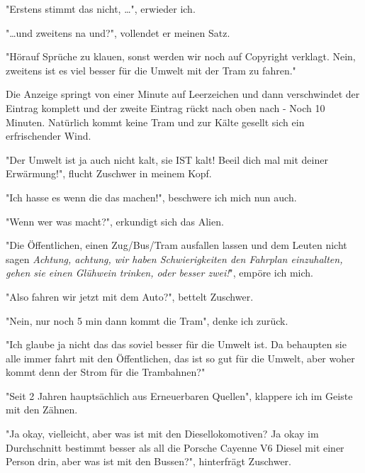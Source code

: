 \documentclass[11pt]{article}
\begin{document}
\begin{center}
"Erstens stimmt das nicht, \ldots{}", erwieder ich.
\end{center}
\begin{center}
"\ldots{}und zweitens na und?", vollendet er meinen Satz.
\end{center}
\begin{center}
"Hörauf Sprüche zu klauen, sonst werden wir noch auf Copyright
verklagt. Nein, zweitens ist es viel besser für die Umwelt mit der
Tram zu fahren."
\end{center}
Die Anzeige springt von einer Minute auf Leerzeichen und dann
verschwindet der Eintrag komplett und der zweite Eintrag rückt nach
oben nach - Noch 10 Minuten. Natürlich kommt keine Tram und zur
Kälte gesellt sich ein erfrischender Wind.
\begin{center}
"Der Umwelt ist ja auch nicht kalt, sie IST kalt! Beeil dich mal mit
deiner Erwärmung!", flucht Zuschwer in meinem Kopf.
\end{center}
\begin{center}
"Ich hasse es wenn die das machen!", beschwere ich mich nun auch.
\end{center}
\begin{center}
"Wenn wer was macht?", erkundigt sich das Alien.
\end{center}
\begin{center}
"Die Öffentlichen, einen Zug/Bus/Tram ausfallen lassen und dem Leuten
nicht sagen \emph{Achtung, achtung, wir haben Schwierigkeiten den Fahrplan
einzuhalten, gehen sie einen Glühwein trinken, oder besser zwei!}",
empöre ich mich.
\end{center}
\begin{center}
"Also fahren wir jetzt mit dem Auto?", bettelt Zuschwer.
\end{center}
\begin{center}
"Nein, nur noch 5 min dann kommt die Tram", denke ich zurück.
\end{center}
\begin{center}
"Ich glaube ja nicht das das soviel besser für die Umwelt ist. Da
behaupten sie alle immer fahrt mit den Öffentlichen, das ist so gut
für die Umwelt, aber woher kommt denn der Strom für die Trambahnen?"
\end{center}
\begin{center}
"Seit 2 Jahren hauptsächlich aus Erneuerbaren Quellen", klappere ich
im Geiste mit den Zähnen.
\end{center}
\begin{center}
"Ja okay, vielleicht, aber was ist mit den Diesellokomotiven? Ja okay
im Durchschnitt bestimmt besser als all die Porsche Cayenne V6 Diesel
mit einer Person drin, aber was ist mit den Bussen?", hinterfrägt Zuschwer.
\end{center}
\end{document}
